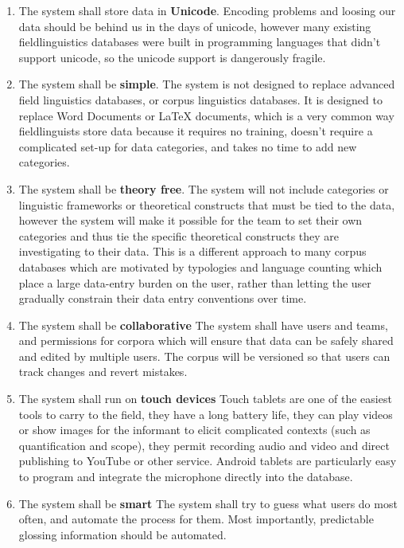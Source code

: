 \documentclass[12pt]{article}
\begin{document}
\begin{exe}
\begin{enumerate}
\begin{enumerate}
\item The system shall store data in \textbf{Unicode}. Encoding problems and loosing our data should be behind us in the days of unicode, however many existing fieldlinguistics databases were built in programming languages that didn't support unicode, so the unicode support is dangerously fragile.
\item The system shall be \textbf{simple}. The system is not designed to replace advanced field linguistics databases, or corpus linguistics databases. It is designed to replace Word Documents or LaTeX documents, which is a very common way fieldlinguists store data because it requires no training, doesn't require a complicated set-up for data categories,  and takes no time to add new categories.
\item The system shall be \textbf{theory free}. The system will not include categories or linguistic frameworks or theoretical constructs that must be tied to the data, however the system will make it possible for the team to set their own categories and thus tie the specific theoretical constructs they are investigating to their data. This is a different approach to many corpus databases which are motivated by typologies and language counting which place a large data-entry burden on the user, rather than letting the user gradually constrain their data entry conventions over time.
\item The system shall be \textbf{collaborative} The system shall have users and teams, and permissions for corpora which will ensure that data can be safely shared and edited by multiple users.  The corpus will be versioned so that users can track changes and revert mistakes.
\item The system shall run on \textbf{touch devices} Touch tablets are one of the easiest tools to carry to the field, they have a long battery life, they can play videos or show images for the informant to elicit complicated contexts (such as quantification and scope), they permit recording audio and video and direct publishing to YouTube or other service. Android tablets are particularly easy to program and integrate the microphone directly into the database. 
\item The system shall be \textbf{smart} The system shall try to guess what users do most often, and automate the process for them. Most importantly, predictable glossing information should be automated.
\end{enumerate}
\end{enumerate}
\end{exe}
\end{document}
